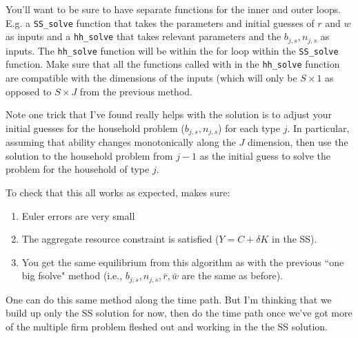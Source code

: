 \documentclass[letterpaper,12pt]{article}
\theoremstyle{definition}
\begin{document}
\begin{spacing}{1.5}
You'll want to be sure to have separate functions for the inner and outer loops.  E.g. a \texttt{SS\_solve} function that takes the parameters and initial guesses of $r$ and $w$ as inputs and a \texttt{hh\_solve} that takes relevant parameters and the $b_{j,s}, n_{j,s}$ as inputs.  The \texttt{hh\_solve} function will be within the for loop within the \texttt{SS\_solve} function.  Make sure that all the functions called with in the \texttt{hh\_solve} function are compatible with the dimensions of the inputs (which will only be $S\times 1$ as opposed to $S\times J$ from the previous method.

Note one trick that I've found really helps with the solution is to adjust your initial guesses for the household problem ($b_{j,s}, n_{j,s}$) for each type $j$.  In particular, assuming that ability changes monotonically along the $J$ dimension, then use the solution to the household problem from $j-1$ as the initial guess to solve the problem for the household of type $j$.

To check that this all works as expected, makes sure:
\begin{enumerate}
\item Euler errors are very small
\item The aggregate resource constraint is satisfied ($Y=C+\delta K$ in the SS).
\item You get the same equilibrium from this algorithm as with the previous ``one big fsolve" method (i.e., $b_{j,s}, n_{j,s}, \bar{r}, \bar{w}$ are the same as before).
\end{enumerate}

One can do this same method along the time path.  But I'm thinking that we build up only the SS solution for now, then do the time path once we've got more of the multiple firm problem fleshed out and working in the the SS solution.



\end{spacing}
\end{document}

